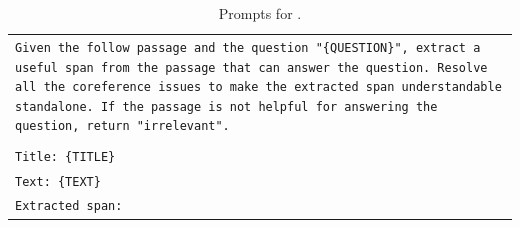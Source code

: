 \begin{table}[h]
    \centering
    \small
    \begin{tabular}{>{\raggedright\arraybackslash\tt}p{}<{}}
        \toprule
Given the follow passage and the question "\{QUESTION\}", extract a useful span from the passage that can answer the question. Resolve all the coreference issues to make the extracted span understandable standalone. If the passage is not helpful for answering the question, return "irrelevant".\\
\\
Title: \{TITLE\}\\
Text: \{TEXT\}\\
Extracted span:\\
        \bottomrule
    \end{tabular}
    \caption{
        Prompts for \snippet{}.
    }
    \label{tab:prompt_snippet}
\end{table}




